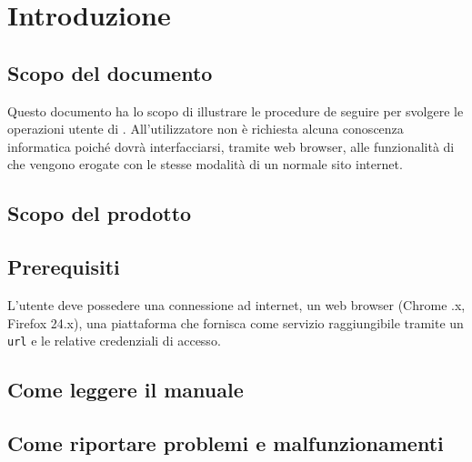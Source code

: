 \section{Introduzione}


\subsection{Scopo del documento}
Questo documento ha lo scopo di illustrare le procedure de seguire per svolgere le operazioni utente di . All'utilizzatore non è richiesta alcuna conoscenza informatica poiché dovrà interfacciarsi, tramite web browser, alle funzionalità di  che vengono erogate con le stesse modalità di un normale sito internet.

\subsection{Scopo del prodotto}
\ScopoDelProdotto 

\subsection{Prerequisiti}
L'utente deve possedere una connessione ad internet, un web browser (Chrome .x, Firefox \geq 24.x), una piattaforma che fornisca  come servizio raggiungibile tramite un \texttt{url} e le relative credenziali di accesso.

\subsection{Come leggere il manuale}

\subsection{Come riportare problemi e malfunzionamenti}






